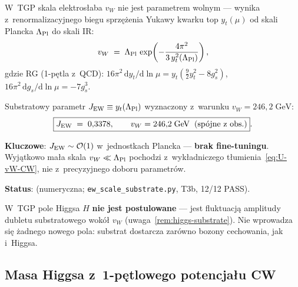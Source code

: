 \begin{proposition}%
\label{prop:U-vW}
W~TGP skala elektros\l{}aba $v_W$ nie jest parametrem wolnym ---
wynika z~renormalizacyjnego biegu sprzężenia Yukawy kwarku top
$y_t(\mu)$ od skali Plancka $\Lambda_{\rm Pl}$ do skali IR:
\begin{equation}\label{eq:U-vW-CW}
  v_W \;=\; \Lambda_{\rm Pl}\,
    \exp\!\left(-\frac{4\pi^2}{3\,y_t^2(\Lambda_{\rm Pl})}\right),
\end{equation}
gdzie RG (1-p\k{e}tla z~QCD):
$16\pi^2\,\mathrm{d}y_t/\mathrm{d}\ln\mu
  = y_t({\textstyle\frac{9}{2}}y_t^2 - 8g_s^2)$,
$16\pi^2\,\mathrm{d}g_s/\mathrm{d}\ln\mu = -7g_s^3$.

Substratowy parametr $J_{\rm EW} \equiv y_t(\Lambda_{\rm Pl})$
wyznaczony z~warunku $v_W = 246{,}2\;\mathrm{GeV}$:
\begin{equation}\label{eq:U-JEW}
  \boxed{J_{\rm EW} \;=\; 0{,}3378,
  \qquad v_W = 246{,}2\;\mathrm{GeV}\;\;(\text{sp\'ojne z~obs.})}.
\end{equation}

\textbf{Kluczowe}: $J_{\rm EW} \sim \mathcal{O}(1)$ w~jednostkach Plancka
--- \textbf{brak fine-tuningu}. Wyj\k{a}tkowo ma\l{}a skala $v_W \ll \Lambda_{\rm Pl}$
pochodzi z~wyk\l{}adniczego t\l{}umienia~\eqref{eq:U-vW-CW}, nie z~precyzyjnego
doboru parametr\'ow.

\textbf{Status}:  (numeryczna; \texttt{ew\_scale\_substrate.py}, T3b, 12/12 PASS).
\end{proposition}

\begin{remark}%
\label{rem:U-higgs-substrate}
W~TGP pole Higgsa $H$ \textbf{nie jest postulowane} ---
jest fluktuacj\k{a} amplitudy dubletu substratowego wok\'o\l{} $v_W$
(uwaga~\ref{rem:higgs-substrate}).
Nie wprowadza si\k{e} \.zadnego nowego pola: substrat dostarcza zar\'owno
bozony cechowania, jak i~Higgsa.
\end{remark}

\subsection{Masa Higgsa z~1-p\k{e}tlowego potencja\l{}u CW}%
\label{app:U-mH}

